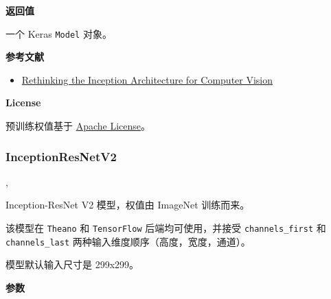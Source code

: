 \textbf{返回值}\label{ux8fd4ux56deux503c-4}

一个 Keras \texttt{Model} 对象。

\textbf{参考文献}\label{ux53c2ux8003ux6587ux732e-4}

\begin{itemize}
\tightlist
\item
  \href{http://arxiv.org/abs/1512.00567}{Rethinking the Inception
  Architecture for Computer Vision}
\end{itemize}

\textbf{License}\label{license-4}

预训练权值基于
\href{https://github.com/tensorflow/models/blob/master/LICENSE}{Apache
License}。



\subsubsection{InceptionResNetV2}\label{inceptionresnetv2}

\begin{Shaded}
\begin{Highlighting}[]
\OperatorTok{=}\OperatorTok{=}\OperatorTok{=}, \\
\hspace{3cm}\OperatorTok{=}\OperatorTok{=}\OperatorTok{=}\NormalTok{)}
\end{Highlighting}
\end{Shaded}

Inception-ResNet V2 模型，权值由 ImageNet 训练而来。

该模型在 \texttt{Theano} 和 \texttt{TensorFlow} 后端均可使用，并接受
\texttt{channels\_first} 和 \texttt{channels\_last}
两种输入维度顺序（高度，宽度，通道）。

模型默认输入尺寸是 299x299。

\textbf{参数}\label{ux53c2ux6570-5}

